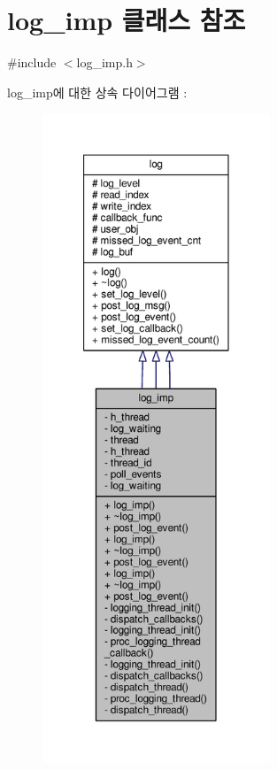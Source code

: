 \hypertarget{classavdecc__lib_1_1log__imp}{}\section{log\+\_\+imp 클래스 참조}
\label{classavdecc__lib_1_1log__imp}


{\ttfamily \#include $<$log\+\_\+imp.\+h$>$}



log\+\_\+imp에 대한 상속 다이어그램 \+: 
\nopagebreak
\begin{figure}[H]
\begin{center}
\leavevmode
\includegraphics[height=550pt]{classavdecc__lib_1_1log__imp__inherit__graph}
\end{center}
\end{figure}


